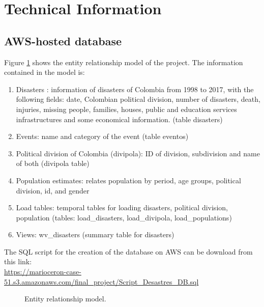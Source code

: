 \section{Technical Information}
\label{sec:Tech}

\subsection{AWS-hosted database}

Figure \ref{fig:er_model} shows the entity relationship model of the project. The information contained in the model is:

\begin{enumerate}

\item Disasters : information of disasters of Colombia from 1998 to 2017, with the following fields: date,  Colombian political division, number of disasters, death, injuries, missing people, families, houses, public and education services infrastructures and some economical  information. (table disasters)
\item Events: name and category of the event (table eventos)
 
\item Political division of Colombia (divipola): ID of division, subdivision and name of both (divipola table)

\item Population estimates: relates population by period, age groups, political division, id, and gender

\item Load tables: temporal tables for loading disasters, political division, population (tables: load\_disasters, load\_divipola, load\_populations)

\item Views: wv\_disasters (summary table for disasters)

\end{enumerate}

The SQL script for the creation of the database on AWS can be download from this link: \\ \url{https://marioceron-case-51.s3.amazonaws.com/final_project/Script_Desastres_DB.sql}{}

 
\begin{figure}[!htb]
\caption{Entity relationship model.}
\label{fig:er_model}
\end{figure}

